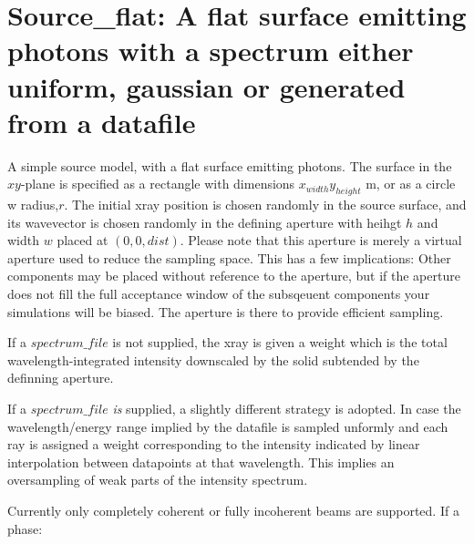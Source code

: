 \section{Source\_flat: A flat surface emitting photons with a spectrum either uniform, gaussian or generated from a datafile}
\label{spurce-flat}

A simple source model, with a flat surface emitting photons. The surface in the
$xy$-plane is specified as a rectangle with dimensions
$x_{width}$\times$y_{height}$ m, or as a circle w radius,$r$. 
The initial xray position is chosen randomly in the source surface, and its
wavevector is chosen randomly in the defining aperture with heihgt $h$ and
width $w$ placed at $(0,0,dist)$. Please note that this aperture is merely a
virtual aperture used to reduce the sampling space. This has a few
implications: Other components may be placed without reference to the aperture,
but if the aperture does not fill the full acceptance window of the subsqeuent
components your simulations will be biased. The aperture is there to provide efficient sampling.

If a $spectrum\_file$ is not supplied, the xray
is given a weight which is the total wavelength-integrated intensity downscaled
by the
solid subtended by the definning aperture.

If a $spectrum\_file$ \emph{is} supplied, a slightly different strategy is adopted. In case the
wavelength/energy range implied by the datafile is sampled unformly and each ray is assigned
a weight corresponding to the intensity indicated by linear interpolation between datapoints
at that wavelength. This implies an oversampling of weak parts of the intensity spectrum.

Currently only completely coherent or fully incoherent beams are supported. If a phase:
